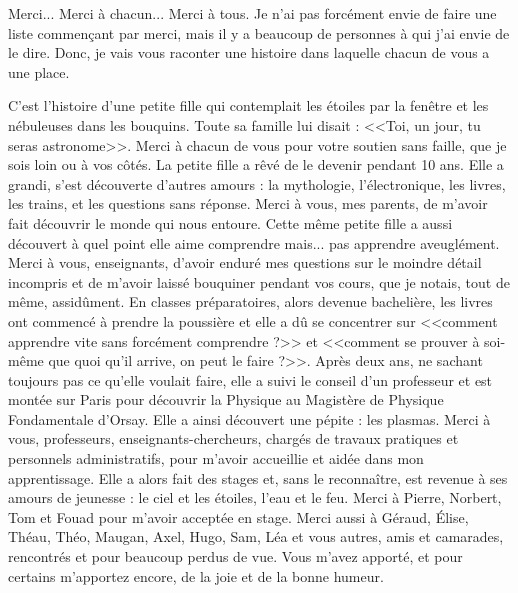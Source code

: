 Merci... Merci à chacun... Merci à tous.
Je n'ai pas forcément envie de faire une liste commençant par merci, mais il y a beaucoup de personnes à qui j'ai envie de le dire. Donc, je vais vous raconter une histoire dans laquelle chacun de vous a une place. 

C'est l'histoire d'une petite fille qui contemplait les étoiles par la fenêtre et les nébuleuses dans les bouquins. Toute sa famille lui disait : <<Toi, un jour, tu seras astronome>>. Merci à chacun de vous pour votre soutien sans faille, que je sois loin ou à vos côtés. La petite fille a rêvé de le devenir pendant 10 ans. Elle a grandi, s'est découverte d'autres amours : la mythologie, l'électronique, les livres, les trains, et les questions sans réponse. Merci à vous, mes parents, de m'avoir fait découvrir le monde qui nous entoure. Cette même petite fille a aussi découvert à quel point elle aime comprendre mais... pas apprendre aveuglément. Merci à vous, enseignants, d'avoir enduré mes questions sur le moindre détail incompris et de m'avoir laissé bouquiner pendant vos cours, que je notais, tout de même, assidûment. En classes préparatoires, alors devenue bachelière, les livres ont commencé à prendre la poussière et elle a dû se concentrer sur <<comment apprendre vite sans forcément comprendre ?>> et <<comment se prouver à soi-même que quoi qu'il arrive, on peut le faire ?>>. Après deux ans, ne sachant toujours pas ce qu'elle voulait faire, elle a suivi le conseil d'un professeur et est montée sur Paris pour découvrir la Physique au Magistère de Physique Fondamentale d'Orsay. Elle a ainsi découvert une pépite : les plasmas. Merci à vous, professeurs, enseignants-chercheurs, chargés de travaux pratiques et personnels administratifs, pour m'avoir accueillie et aidée dans mon apprentissage. Elle a alors fait des stages et, sans le reconnaître, est revenue à ses amours de jeunesse : le ciel et les étoiles, l'eau et le feu. Merci à Pierre, Norbert, Tom et Fouad pour m'avoir acceptée en stage. Merci aussi à Géraud, Élise, Théau, Théo, Maugan, Axel, Hugo, Sam, Léa et vous autres, amis et camarades, rencontrés et pour beaucoup perdus de vue. Vous m'avez apporté, et pour certains m'apportez encore, de la joie et de la bonne humeur. 

